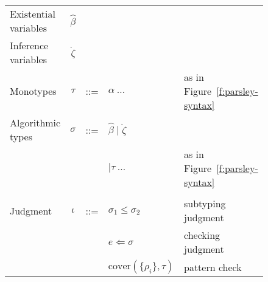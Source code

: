 \documentclass[letterpaper]{article}
\newcommand{\utv}{\alpha}             %
\newcommand{\etv}{{\widehat{\beta}}}  %
\newcommand{\stv}{{\grave{\zeta}}}    %
\begin{document}
\begin{figure}
  \begin{tabular}{l c l l l}
    Existential variables & $\etv$   &     &                                   & \\
    Inference variables   & $\stv$   &     &                                   & \\
    Monotypes             & $\tau$   & ::= & $ \utv\ \ldots $                  & as in Figure~\ref{f:parsley-syntax} \\
    Algorithmic types     & $\sigma$ & ::= & $ \etv \mid \stv $                & \\
                          &          &     & $ \mid \tau\ \ldots $             & as in Figure~\ref{f:parsley-syntax} \\
                          &          &     &                                   & \\
    Judgment              & $\iota$  & ::= & $ \sigma_1\leq\sigma_2 $          & subtyping judgment \\
                          &          &     & $ e\Leftarrow\sigma $             & checking judgment \\
                          &          &     & $ \mathrm{cover}(\{\rho_i\}, \tau) $ & pattern check \\


\end{tabular}
\end{figure}
\end{document}
